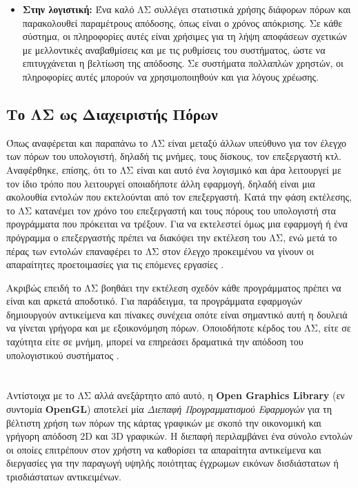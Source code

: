 \documentclass{report}
\newcommand{\engl}[1]{{\selectlanguage{english}{#1}}}
\begin{document}
\begin{itemize}
    \item \textbf{Στην λογιστική:} Ένα καλό ΛΣ συλλέγει στατιστικά χρήσης διάφορων πόρων και παρακολουθεί παραμέτρους απόδοσης, όπως είναι ο χρόνος απόκρισης. Σε κάθε σύστημα, οι πληροφορίες αυτές είναι χρήσιμες για τη λήψη αποφάσεων σχετικών με μελλοντικές αναβαθμίσεις και με τις ρυθμίσεις του συστήματος, ώστε να επιτυγχάνεται η βελτίωση της απόδοσης. Σε συστήματα πολλαπλών χρηστών, οι πληροφορίες αυτές μπορούν να χρησιμοποιηθούν και για λόγους χρέωσης.
\end{itemize}
\subsection{Το ΛΣ ως Διαχειριστής Πόρων}
Όπως αναφέρεται και παραπάνω το ΛΣ είναι μεταξύ άλλων υπεύθυνο για τον έλεγχο των πόρων του υπολογιστή, δηλαδή τις μνήμες, τους δίσκους, τον επεξεργαστή κτλ. Αναφέρθηκε, επίσης, ότι το ΛΣ είναι και αυτό ένα λογισμικό και άρα λειτουργεί με τον ίδιο τρόπο που λειτουργεί οποιαδήποτε άλλη εφαρμογή, δηλαδή είναι μια ακολουθία εντολών που εκτελούνται από τον επεξεργαστή. Κατά την φάση εκτέλεσης, το ΛΣ κατανέμει τον χρόνο του επεξεργαστή και τους πόρους του υπολογιστή στα προγράμματα που πρόκειται να τρέξουν. Για να εκτελεστεί όμως μια εφαρμογή ή ένα πρόγραμμα ο επεξεργαστής πρέπει να διακόψει την εκτέλεση του ΛΣ, ενώ μετά το πέρας των εντολών επαναφέρει το ΛΣ στον έλεγχο προκειμένου να γίνουν οι απαραίτητες προετοιμασίες για τις επόμενες εργασίες \cite{stallings}.

Ακριβώς επειδή το ΛΣ βοηθάει την εκτέλεση σχεδόν κάθε προγράμματος πρέπει να είναι και αρκετά αποδοτικό. Για παράδειγμα, τα προγράμματα εφαρμογών δημιουργούν αντικείμενα και πίνακες συνέχεια οπότε είναι σημαντικό αυτή η δουλειά να γίνεται γρήγορα και με εξοικονόμηση πόρων. Οποιοδήποτε κέρδος του ΛΣ, είτε σε ταχύτητα είτε σε μνήμη, μπορεί να επηρεάσει δραματικά την απόδοση του υπολογιστικού συστήματος \cite{elements_of_computing}.

\section{\texorpdfstring{\engl{Open Graphics Library}}{Open Graphics Library}}
Αντίστοιχα με το ΛΣ αλλά ανεξάρτητο από αυτό, η \textbf{Open Graphics Library}\cite{opengl_specification} (εν συντομία \textbf{OpenGL}) αποτελεί μία \textsl{Διεπαφή Προγραμματισμού Εφαρμογών} για τη βέλτιστη χρήση των πόρων της κάρτας γραφικών με σκοπό την οικονομική και γρήγορη απόδοση {2D} και {3D} γραφικών. Η διεπαφή περιλαμβάνει ένα σύνολο εντολών οι οποίες επιτρέπουν στον χρήστη να καθορίσει τα απαραίτητα αντικείμενα και διεργασίες για την παραγωγή υψηλής ποιότητας έγχρωμων εικόνων δισδιάστατων ή τρισδιάστατων αντικειμένων.
\end{document}
